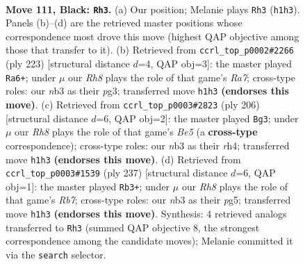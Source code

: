 \documentclass[11pt]{article}
\begin{document}
\clearpage

\begin{figure}[p]\centering
\begin{subfigure}{0.46\textwidth}\centering
\resizebox{\linewidth}{!}{%
\newchessgame
\chessboard[
  setfen={8/5R2/2k5/6K1/6P1/1N6/8/7r b - - 6 111},
  showmover=false,
  pgfstyle=straightmove, color=movearrow, markmove={h1-h3}
]}
\caption{}
\end{subfigure}\hfill
\begin{subfigure}{0.46\textwidth}\centering
\resizebox{\linewidth}{!}{%
\newchessgame
\chessboard[
  setfen={6k1/1R6/6K1/6P1/8/6P1/r7/8 b - - 20 112},
  showmover=false,
  pgfstyle=straightmove, color=movearrow, markmove={a2-a6}
]}
\caption{}
\end{subfigure}
\\[4pt]
\begin{subfigure}{0.46\textwidth}\centering
\resizebox{\linewidth}{!}{%
\newchessgame
\chessboard[
  setfen={6R1/4k3/4p3/4B3/7r/8/4K3/8 w - - 3 104},
  showmover=false,
  pgfstyle=straightmove, color=movearrow, markmove={e5-g3}
]}
\caption{}
\end{subfigure}\hfill
\begin{subfigure}{0.46\textwidth}\centering
\resizebox{\linewidth}{!}{%
\newchessgame
\chessboard[
  setfen={8/6k1/4R3/6P1/6P1/6K1/1r6/8 b - - 12 119},
  showmover=false,
  pgfstyle=straightmove, color=movearrow, markmove={b2-b3}
]}
\caption{}
\end{subfigure}
\caption{\textbf{Move 111, Black: \texttt{Rh3}.} (a) Our position; Melanie plays \texttt{Rh3} (\texttt{h1h3}). Panels (b)--(d) are the retrieved master positions whose correspondence most drove this move (highest QAP objective among those that transfer to it). (b) Retrieved from \texttt{ccrl\_top\_p0002\#2266} (ply 223) [structural distance $d$=4, QAP obj=3]: the master played \texttt{Ra6+}; under $\mu$ our \emph{Rh8} plays the role of that game's \emph{Ra7}; cross-type roles: our \emph{n}b3 as their \emph{p}g3; transferred move \texttt{h1h3} \textbf{(endorses this move)}. (c) Retrieved from \texttt{ccrl\_top\_p0003\#2823} (ply 206) [structural distance $d$=6, QAP obj=2]: the master played \texttt{Bg3}; under $\mu$ our \emph{Rh8} plays the role of that game's \emph{Be5} (a \textbf{cross-type} correspondence); cross-type roles: our \emph{n}b3 as their \emph{r}h4; transferred move \texttt{h1h3} \textbf{(endorses this move)}. (d) Retrieved from \texttt{ccrl\_top\_p0003\#1539} (ply 237) [structural distance $d$=6, QAP obj=1]: the master played \texttt{Rb3+}; under $\mu$ our \emph{Rh8} plays the role of that game's \emph{Rb7}; cross-type roles: our \emph{n}b3 as their \emph{p}g5; transferred move \texttt{h1h3} \textbf{(endorses this move)}. Synthesis: 4 retrieved analogs transferred to \texttt{Rh3} (summed QAP objective 8, the strongest correspondence among the candidate moves); Melanie committed it via the \texttt{search} selector.}
\label{fig:thought-m221}
\end{figure}
\end{document}

